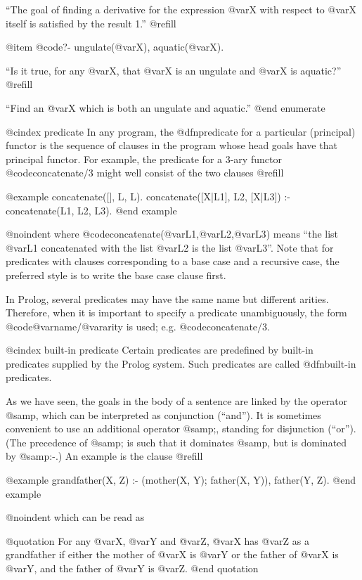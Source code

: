 {``The goal of finding a derivative for the expression @var{X} with
respect to @var{X} itself is satisfied by the result 1.'' @refill

@item
@code{?- ungulate(@var{X}), aquatic(@var{X}).}

``Is it true, for any @var{X}, that @var{X} is an ungulate and @var{X} is
aquatic?'' @refill

``Find an @var{X} which is both an ungulate and aquatic.''
@end enumerate

@cindex predicate
In any program, the @dfn{predicate} for a particular (principal) functor
is the sequence of clauses in the program whose head goals have that
principal functor.  For example, the predicate for a 3-ary functor
@code{concatenate/3} might well consist of the two clauses @refill

@example
concatenate([], L, L).
concatenate([X|L1], L2, [X|L3]) :- concatenate(L1, L2, L3).
@end example

@noindent
where @code{concatenate(@var{L1},@var{L2},@var{L3})} means ``the list
@var{L1} concatenated with the list @var{L2} is the list @var{L3}''.
Note that for predicates with clauses corresponding to a base case and a
recursive case, the preferred style is to write the base case clause
first.

In Prolog, several predicates may have the same name but different
arities.  Therefore, when it is important to specify a predicate
unambiguously, the form @code{@var{name}/@var{arity}} is used; e.g.
@code{concatenate/3}.

@cindex built-in predicate
Certain predicates are predefined by built-in predicates supplied by the
Prolog system.  Such predicates are called @dfn{built-in predicates}.

As we have seen, the goals in the body of a sentence are linked by the
operator @samp{,} which can be interpreted as conjunction (``and'').  It
is sometimes convenient to use an additional operator @samp{;}, standing
for disjunction (``or'').  (The precedence of @samp{;} is such that it
dominates @samp{,} but is dominated by @samp{:-}.)  An example is the
clause @refill

@example
grandfather(X, Z) :-
        (mother(X, Y); father(X, Y)),
        father(Y, Z).
@end example

@noindent
which can be read as 

@quotation
For any @var{X}, @var{Y} and @var{Z}, @var{X} has @var{Z} as a
grandfather if either the mother of @var{X} is @var{Y} or the father of
@var{X} is @var{Y}, and the father of @var{Y} is @var{Z}.
@end quotation

}
